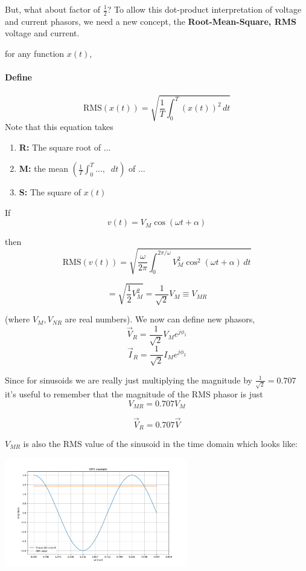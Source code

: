 But, what about factor of $\frac{1}{2}$?    To allow this dot-product interpretation of
voltage and current phasors, we need a new concept, the {\bf Root-Mean-Square, RMS} voltage
and current.

for any function $x(t)$,

\paragraph{Define}

\[
\text{RMS}(x(t)) = \sqrt{\frac{1}{T} \int_0^T (x(t))^2 \, dt}
\]
Note that this equation takes
\begin{enumerate}
    \item {\bf R: } The square root of ...
    \item {\bf M: }the mean $\left ( \frac{1}{T} \int_0^T ... ,\;\; dt \right )$ of ...
    \item {\bf S: }The square of $x(t)$
\end{enumerate}

If
\[
v(t) = V_M \cos(\omega t + \alpha)
\]

then
\[
\text{RMS}(v(t)) = \sqrt{\frac{\omega}{2\pi} \int_0^{2\pi/\omega} V_M^2 \cos^2(\omega t + \alpha) \, dt}
\]


\[
=\sqrt{ \frac{1}{2} V_M^2 }
= \frac{1}{\sqrt{2}} V_M \equiv V_{MR}
\]

(where $V_M, V_{NR}$ are real numbers).
We now can  define new phasors,
\[
\vec V_R = \frac {1}  {\sqrt{2}}  V_M e^{j\phi_1}
\]
\[
\vec I_R = \frac {1}  {\sqrt{2}}  I_M e^{j\phi_2}
\]

Since for sinusoids we are really just multiplying the magnitude by $\frac {1}  {\sqrt{2}} = 0.707$ it's useful to remember
that  the magnitude of the RMS phasor is just
\[
V_{MR} = 0.707 V_M
\]

\[
\vec V_R = 0.707 \vec V
\]

$V_{MR}$ is also the RMS value of the sinusoid in the time domain
which looks like:

\includegraphics[width=80mm]{figsChapt03/FP56580.png}



